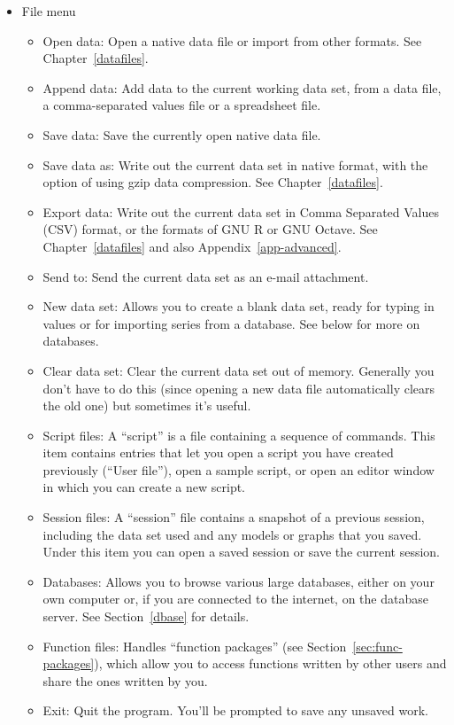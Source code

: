 \begin{itemize}
\item \textsf{File menu}
  \begin{itemize}
  \item \textsf{Open data}: Open a native  data file or
    import from other formats.  See Chapter~\ref{datafiles}.
  \item \textsf{Append data}: Add data to the current working data
    set, from a  data file, a comma-separated values file
    or a spreadsheet file.
  \item \textsf{Save data}: Save the currently open native 
    data file.
  \item \textsf{Save data as}: Write out the current data set in
    native format, with the option of using gzip data compression. See
    Chapter~\ref{datafiles}.
  \item \textsf{Export data}: Write out the current data set in Comma
    Separated Values (CSV) format, or the formats of GNU R or GNU
    Octave. See Chapter~\ref{datafiles} and also
    Appendix~\ref{app-advanced}.
  \item \textsf{Send to}: Send the current data set as an e-mail
    attachment.
  \item \textsf{New data set}: Allows you to create a blank data set,
    ready for typing in values or for importing series from a
    database.  See below for more on databases.
  \item \textsf{Clear data set}: Clear the current data set out of
    memory.  Generally you don't have to do this (since opening a new
    data file automatically clears the old one) but sometimes it's
    useful.
  \item \textsf{Script files}: A ``script'' is a file containing a
    sequence of  commands.  This item contains entries
    that let you open a script you have created previously (``User
    file''), open a sample script, or open an editor window in which
    you can create a new script.
  \item \textsf{Session files}: A ``session'' file contains a snapshot
    of a previous  session, including the data set used
    and any models or graphs that you saved.  Under this item you
    can open a saved session or save the current session.
  \item \textsf{Databases}: Allows you to browse various large
    databases, either on your own computer or, if you are connected
    to the internet, on the  database server.  See
    Section~\ref{dbase} for details.
  \item \textsf{Function files}: Handles ``function packages'' (see
    Section~\ref{sec:func-packages}), which allow you to access
    functions written by other users and share the ones written by
    you.
  \item \textsf{Exit}: Quit the program.  You'll be prompted to save
    any unsaved work.
  \end{itemize}


\end{itemize}

